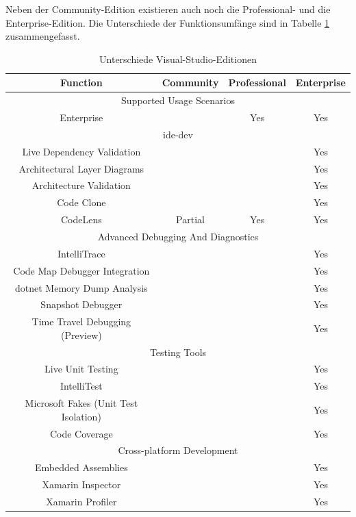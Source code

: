 Neben der Community-Edition existieren auch noch die Professional- und die Enterprise-Edition.
Die Unterschiede der Funktionsumfänge sind in Tabelle \ref{tab:vs-comp} zusammengefasst.
\begin{table}[htbp!]
    \centering\begin{tabular}{c | c | c | c}
        \toprule
        \textbf{Function} & \textbf{Community} & \textbf{Professional} & \textbf{Enterprise}\\
        \toprule
        \multicolumn{4}{c}{Supported Usage Scenarios}\\
        \midrule
        Enterprise & & Yes & Yes\\
        \midrule
        \multicolumn{4}{c}{\ac{ide-dev}}\\
        \midrule
        Live Dependency Validation&&&Yes\\
        Architectural Layer Diagrams&&&Yes\\
        Architecture Validation&&&Yes\\
        Code Clone&&&Yes\\
        CodeLens&Partial&Yes&Yes\\
        \midrule
        \multicolumn{4}{c}{Advanced Debugging And Diagnostics}\\
        \midrule
        IntelliTrace&&&Yes\\
        Code Map Debugger Integration&&&Yes\\
        \ac{dotnet} Memory Dump Analysis&&&Yes\\
        Snapshot Debugger&&&Yes\\
        Time Travel Debugging (Preview)&&&Yes\\
        \midrule
        \multicolumn{4}{c}{Testing Tools}\\
        \midrule
        Live Unit Testing&&&Yes\\
        IntelliTest&&&Yes\\
        Microsoft Fakes (Unit Test Isolation)&&&Yes\\
        Code Coverage&&&Yes\\
        \midrule
        \multicolumn{4}{c}{Cross-platform Development}\\
        \midrule
        Embedded Assemblies&&&Yes\\
        Xamarin Inspector&&&Yes\\
        Xamarin Profiler&&&Yes\\
        \bottomrule
    \end{tabular}
    \caption{Unterschiede Visual-Studio-Editionen \cite[vgl.][]{ms-vs-compare}}
    \label{tab:vs-comp}
\end{table}

